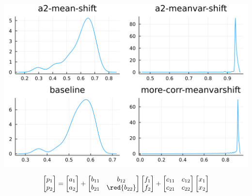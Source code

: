 \documentclass[
  ignorenonframetext,
]{beamer}
\begin{document}
\begin{frame}{}
\protect\hypertarget{section-7}{}
\begin{center}\includegraphics[width=0.95\paperheight]{complexity_files/figure-beamer/unnamed-chunk-29-1} \end{center}

\[
\begin{bmatrix}
 p_1 \\ p_2
\end{bmatrix} =
\begin{bmatrix}
 a_1 \\ {a_2}
\end{bmatrix}
 + 
 \begin{bmatrix}
 {b_{11}} & b_{12} \\
 b_{21} & \red{b_{22}}
\end{bmatrix}
\begin{bmatrix}
 f_1 \\ f_2
\end{bmatrix}
+
 \begin{bmatrix}
 c_{11} & c_{12} \\
 c_{21} & c_{22}
\end{bmatrix}
\begin{bmatrix}
 x_1 \\ x_2
\end{bmatrix}
\]
\end{frame}
\end{document}
